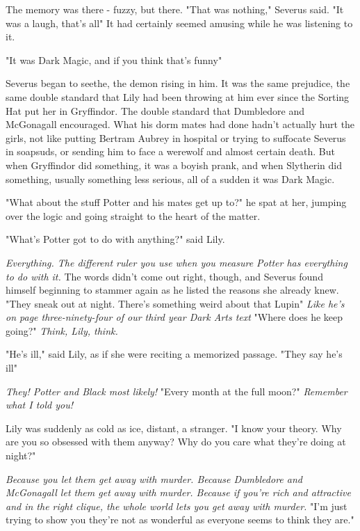The memory was there - fuzzy, but there. "That was nothing," Severus said. "It was a laugh, that's all{\el}" It had certainly seemed amusing while he was listening to it.

"It was Dark Magic, and if you think that's funny{\el}"

Severus began to seethe, the demon rising in him. It was the same prejudice, the same double standard that Lily had been throwing at him ever since the Sorting Hat put her in Gryffindor. The double standard that Dumbledore and McGonagall encouraged. What his dorm mates had done hadn't actually hurt the girls, not like putting Bertram Aubrey in hospital or trying to suffocate Severus in soapsuds, or sending him to face a werewolf and almost certain death. But when Gryffindor did something, it was a boyish prank, and when Slytherin did something, usually something less serious, all of a sudden it was Dark Magic.

"What about the stuff Potter and his mates get up to?" he spat at her, jumping over the logic and going straight to the heart of the matter.

"What's Potter got to do with anything?" said Lily.

\emph{Everything. The different ruler you use when you measure Potter has everything to do with it.} The words didn't come out right, though, and Severus found himself beginning to stammer again as he listed the reasons she already knew. "They{\el} sneak out at night. There's{\el} something weird about that Lupin{\el}" \emph{Like he's on page three-ninety-four of our third year Dark Arts text{\el}} "Where does he keep going?" \emph{Think, Lily, think.}

"He's ill," said Lily, as if she were reciting a memorized passage. "They say he's ill{\el}"

\emph{They! Potter and Black most likely!} "Every month at the full moon?" \emph{Remember what I told you!}

Lily was suddenly as cold as ice, distant, a stranger. "I know your theory. Why are you so obsessed with them anyway? Why do you care what they're doing at night?"

\emph{Because you let them get away with murder. Because Dumbledore and McGonagall let them get away with murder. Because if you're rich and attractive and in the right clique, the whole world lets you get away with murder.} "I'm just trying to{\el} show you they're not as{\el} wonderful as everyone seems to{\el} think they are."

